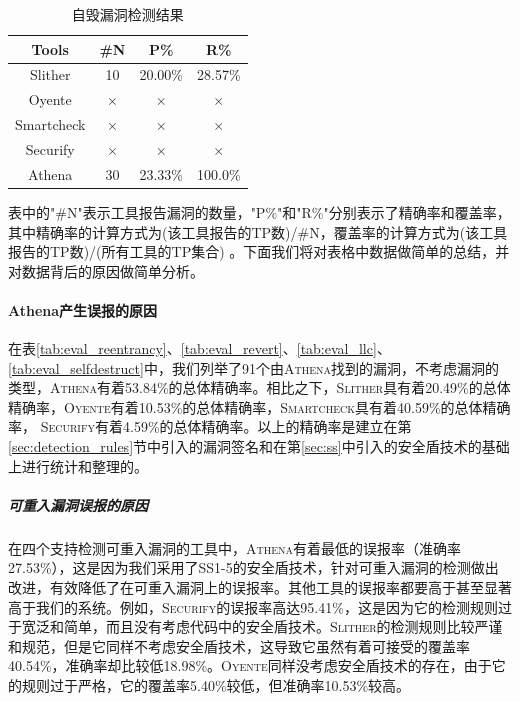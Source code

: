 \begin{table}[htbp]
\begin{minipage}[t]{0.48\textwidth}
  \label{tab:eval_llc}%
  \end{minipage}
  \begin{minipage}[t]{0.48\textwidth}
    \caption{自毁漏洞检测结果}
    \begin{tabular}{cccc}
    \toprule
    Tools & \#N & P\% & R\% \\
    \midrule
    Slither & 10    & 20.00\%    & 28.57\% \\
    Oyente  & $\times$ & $\times$ & $\times$ \\
    Smartcheck  & $\times$ & $\times$ & $\times$ \\
    Securify & $\times$  & $\times$ & $\times$ \\
    Athena & 30    & 23.33\%     & 100.0\% \\
    \bottomrule
    \end{tabular}%
  \label{tab:eval_selfdestruct}%
  \end{minipage}
    \label{tab:eval_all}
\end{table}%

表中的"\#N"表示工具报告漏洞的数量，"P\%"和"R\%"分别表示了精确率和覆盖率，其中精确率的计算方式为(该工具报告的TP数)/\#N，覆盖率的计算方式为(该工具报告的TP数)/(所有工具的TP集合) 。下面我们将对表格中数据做简单的总结，并对数据背后的原因做简单分析。

\paragraph{Athena产生误报的原因}

在表\ref{tab:eval_reentrancy}、\ref{tab:eval_revert}、\ref{tab:eval_llc}、\ref{tab:eval_selfdestruct}中，我们列举了91个由\textsc{Athena}找到的漏洞，不考虑漏洞的类型，\textsc{Athena}有着53.84\%的总体精确率。相比之下，\textsc{Slither}具有着20.49\%的总体精确率，\textsc{Oyente}有着10.53\%的总体精确率，\textsc{Smartcheck}具有着40.59\%的总体精确率， \textsc{Securify}有着4.59\%的总体精确率。以上的精确率是建立在第\ref{sec:detection_rules}节中引入的漏洞签名和在第\ref{sec:ss}中引入的安全盾技术的基础上进行统计和整理的。

\subparagraph{可重入漏洞误报的原因}

在四个支持检测可重入漏洞的工具中，\textsc{Athena}有着最低的误报率（准确率27.53\%），这是因为我们采用了SS1-5的安全盾技术，针对可重入漏洞的检测做出改进，有效降低了在可重入漏洞上的误报率。其他工具的误报率都要高于甚至显著高于我们的系统。例如，\textsc{Securify}的误报率高达95.41\%，这是因为它的检测规则过于宽泛和简单，而且没有考虑代码中的安全盾技术。\textsc{Slither}的检测规则比较严谨和规范，但是它同样不考虑安全盾技术，这导致它虽然有着可接受的覆盖率40.54\%，准确率却比较低18.98\%。\textsc{Oyente}同样没考虑安全盾技术的存在，由于它的规则过于严格，它的覆盖率5.40\%较低，但准确率10.53\%较高。

